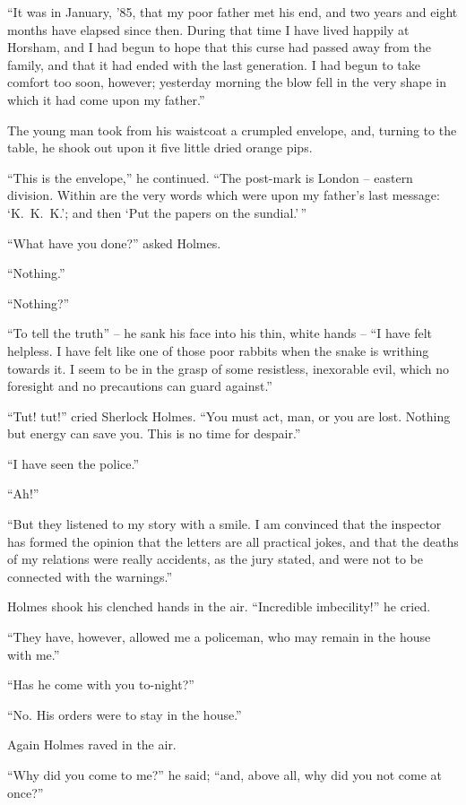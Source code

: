 “It was in January, ’85, that my poor father met his end,
and two years and eight months have elapsed since then.
During that time I have lived happily at Horsham, and I had
begun to hope that this curse had passed away from the family,
and that it had ended with the last generation. I had begun
to take comfort too soon, however; yesterday morning the
blow fell in the very shape in which it had come upon my
father.”

The young man took from his waistcoat a crumpled envelope,
and, turning to the table, he shook out upon it five
little dried orange pips.

“This is the envelope,” he continued. “The post-mark is
London -- eastern division. Within are the very words which
were upon my father’s last message: ‘K.\ K.\ K.’; and then
‘Put the papers on the sundial.’\,”

“What have you done?” asked Holmes.

“Nothing.”

“Nothing?”

“To tell the truth” -- he sank his face into his thin, white
hands -- “I have felt helpless. I have felt like one of those
poor rabbits when the snake is writhing towards it. I seem
to be in the grasp of some resistless, inexorable evil, which
no foresight and no precautions can guard against.”

“Tut! tut!” cried Sherlock Holmes. “You must act, man,
or you are lost. Nothing but energy can save you. This is
no time for despair.”

“I have seen the police.”

“Ah!”

“But they listened to my story with a smile. I am convinced
that the inspector has formed the opinion that the
letters are all practical jokes, and that the deaths of my relations
were really accidents, as the jury stated, and were not
to be connected with the warnings.”

Holmes shook his clenched hands in the air. “Incredible
imbecility!” he cried.

“They have, however, allowed me a policeman, who may
remain in the house with me.”

“Has he come with you to-night?”

“No. His orders were to stay in the house.”

Again Holmes raved in the air.

“Why did you come to me?” he said; “and, above all,
why did you not come at once?”

